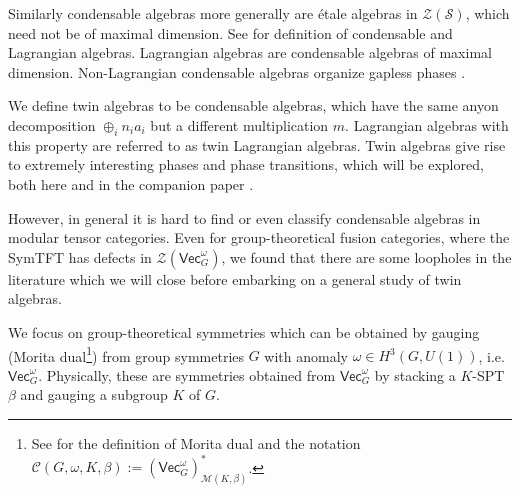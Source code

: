 \documentclass[aps,twocolumn,prx,floatfix,preprintnumbers, nofootinbib,10pt]{revtex4-2}
\numberwithin{equation}{section}
\theoremstyle{definition}
\newcommand{\cC}{\mathcal{C}}
\newcommand{\cM}{\mathcal{M}}
\newcommand{\cS}{\mathcal{S}}
\newcommand{\cZ}{\mathcal{Z}}
\renewcommand{\Vec}{\mathsf{Vec}}
\begin{document}
Similarly condensable algebras more generally are \'etale algebras in $\cZ (\cS)$, which need not be of maximal dimension. See  for definition of condensable and Lagrangian algebras. Lagrangian algebras are condensable algebras of maximal dimension. Non-Lagrangian condensable algebras organize gapless phases \cite{Chatterjee:2022tyg,Bhardwaj:2023bbf, Wen:2023otf, Bhardwaj:2024qrf}. 

\vspace{2mm}
We define twin algebras to be condensable algebras, which have the same anyon decomposition $\oplus_i n_i a_i$ but a different multiplication $m$. 
Lagrangian algebras with this property are referred to as twin Lagrangian algebras.  
Twin algebras give rise to extremely interesting phases and phase transitions, which will be explored, both here and in the companion paper \cite{WGS}. 

However, 
in general it is hard to find or even classify condensable algebras in modular tensor categories. Even for group-theoretical fusion categories, where the SymTFT has defects in $\cZ (\Vec_G^\omega)$, we found that there are some loopholes in the literature which we will close before embarking on a general study of twin algebras. 



\vspace{2mm}
We focus on group-theoretical symmetries 
which can be obtained by gauging (Morita dual\footnote{See  for the definition of Morita dual and the notation $\cC(G, \omega, K, \beta):=(\Vec_G^\omega)_{\cM(K, \beta)}^*$. }) from group symmetries $G$ with anomaly $\omega \in H^3 (G, U(1))$, i.e. $\Vec_G^\omega$.   Physically, these are symmetries obtained from $\Vec_G^\omega$ by stacking a $K$-SPT $\beta$ and gauging a subgroup $K$ of $G$. 
\end{document}
